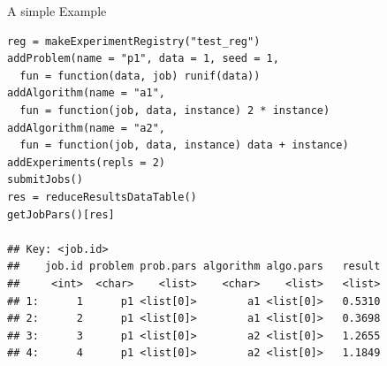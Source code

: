 \documentclass[10pt,compress,t,notes=noshow, xcolor=table]{beamer}
\begin{document}
\begin{frame}[fragile]{A simple Example}
  
\begin{lstlisting}
reg = makeExperimentRegistry("test_reg")
addProblem(name = "p1", data = 1, seed = 1,
  fun = function(data, job) runif(data))
addAlgorithm(name = "a1",
  fun = function(job, data, instance) 2 * instance)
addAlgorithm(name = "a2",
  fun = function(job, data, instance) data + instance)
addExperiments(repls = 2)
submitJobs()
res = reduceResultsDataTable()
getJobPars()[res]

## Key: <job.id>
##    job.id problem prob.pars algorithm algo.pars   result
##     <int>  <char>    <list>    <char>    <list>   <list>
## 1:      1      p1 <list[0]>        a1 <list[0]>   0.5310
## 2:      2      p1 <list[0]>        a1 <list[0]>   0.3698
## 3:      3      p1 <list[0]>        a2 <list[0]>   1.2655
## 4:      4      p1 <list[0]>        a2 <list[0]>   1.1849
\end{lstlisting}
  
\end{frame}

\end{document}
